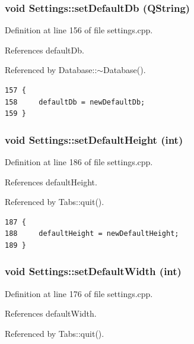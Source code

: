 \hypertarget{classSettings_a8}{
\subsubsection[setDefaultDb]{\setlength{\rightskip}{0pt plus 5cm}void Settings::set\-Default\-Db (QString)}}
\label{classSettings_a8}


Definition at line 156 of file settings.cpp.

References default\-Db.

Referenced by Database::$\sim$Database().

\footnotesize\begin{verbatim}157 {
158     defaultDb = newDefaultDb;
159 }
\end{verbatim}\normalsize 


\hypertarget{classSettings_a14}{
\subsubsection[setDefaultHeight]{\setlength{\rightskip}{0pt plus 5cm}void Settings::set\-Default\-Height (int)}}
\label{classSettings_a14}


Definition at line 186 of file settings.cpp.

References default\-Height.

Referenced by Tabs::quit().

\footnotesize\begin{verbatim}187 {
188     defaultHeight = newDefaultHeight;
189 }
\end{verbatim}\normalsize 


\hypertarget{classSettings_a12}{
\subsubsection[setDefaultWidth]{\setlength{\rightskip}{0pt plus 5cm}void Settings::set\-Default\-Width (int)}}
\label{classSettings_a12}


Definition at line 176 of file settings.cpp.

References default\-Width.

Referenced by Tabs::quit().

